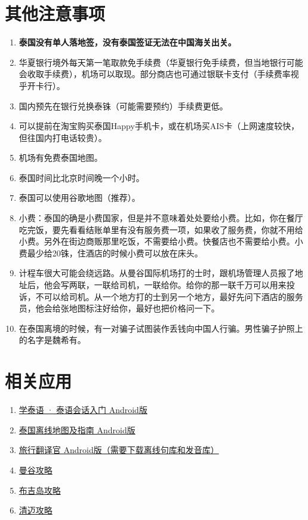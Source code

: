 \documentclass[utf-8,10pt]{ctexart}
\begin{document}
\section{其他注意事项}
\begin{enumerate}
\item \textbf{泰国没有单人落地签，没有泰国签证无法在中国海关出关。}
\item 华夏银行境外每天第一笔取款免手续费（华夏银行免手续费，但当地银行可能会收取手续费），机场可以取现。部分商店也可通过银联卡支付（手续费率视乎开卡行）。
\item 国内预先在银行兑换泰铢（可能需要预约）手续费更低。
\item 可以提前在淘宝购买泰国Happy手机卡，或在机场买AIS卡（上网速度较快，但往国内打电话较贵）。
\item 机场有免费泰国地图。
\item 泰国时间比北京时间晚一个小时。
\item 泰国可以使用谷歌地图（推荐）。
\item 小费：泰国的确是小费国家，但是并不意味着处处要给小费。比如，你在餐厅吃完饭，要先看看结账单里有没有服务费一项，如果收了服务费，你就不用给小费。另外在街边商贩那里吃饭，不需要给小费。快餐店也不需要给小费。小费最少给20铢，住酒店的时候小费可以放在床头。
\item 计程车很大可能会绕远路。从曼谷国际机场打的士时，跟机场管理人员报了地址后，他会写两联，一联给司机，一联给你。给你的那一联千万可以用来投诉，不可以给司机。从一个地方打的士到另一个地方，最好先问下酒店的服务员，他会给张地图标注好给你，最好也把价格问一下。
\item 在泰国离境的时候，有一对骗子试图装作丢钱向中国人行骗。男性骗子护照上的名字是魏希有。
\end{enumerate}
\section{相关应用}
\begin{enumerate}
\item \href{http://voyager2718.github.io/APK/com.bravolang.thai.apk}{学泰语 · 泰语会话入门 Android版}
\item \href{http://voyager2718.github.io/APK/off.guide.maps.thailand.apk}{泰国离线地图及指南 Android版}
\item \href{http://voyager2718.github.io/APK/travel.translator.apk}{旅行翻译官 Android版（需要下载离线句库和发音库）}
\item \href{http://qiugonglue.com/app/2}{曼谷攻略}
\item \href{http://qiugonglue.com/app/3}{布吉岛攻略}
\item \href{http://qiugonglue.com/app/4}{清迈攻略}
\end{enumerate}
\end{document}
